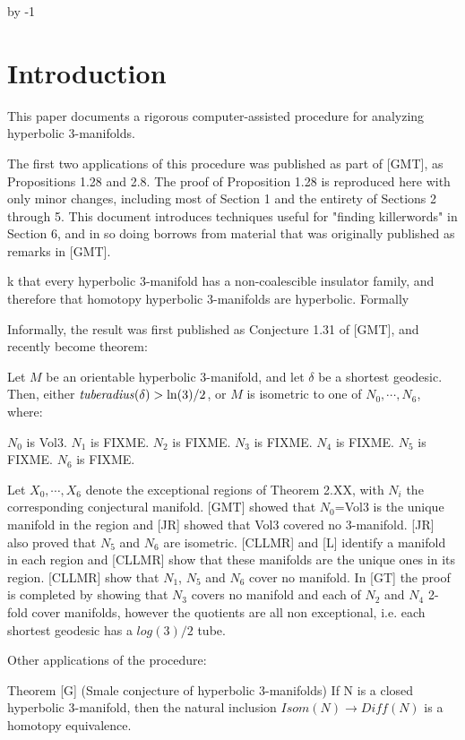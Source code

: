 \def\Arccosh{{\rm Arccosh}}
\advance\sectioncount by -1
\section{Introduction}

This paper documents a rigorous computer-assisted procedure for analyzing 
hyperbolic $3$-manifolds.

The first two applications of this procedure was published as part of [GMT],
as Propositions 1.28 and 2.8. The proof of Proposition 1.28 is reproduced here
with only minor changes, including most of Section 1 and the entirety of Sections 2 through 5.
This document introduces techniques useful for "finding killerwords" in Section 6,
and in so doing borrows from material that was originally published as remarks
in [GMT].

k
that every hyperbolic $3$-manifold has a non-coalescible insulator family,
and therefore that homotopy hyperbolic $3$-manifolds are hyperbolic. Formally

Informally, the result was first published as Conjecture 1.31 of [GMT],
and recently become theorem:

 Let $M$ be an orientable hyperbolic $3$-manifold, and let $\delta$ be
a shortest geodesic. Then, either ${\it tuberadius}(\delta) > \ln(3)/2$, or
$M$ is isometric to one of $N_0, \cdots, N_6$, where:
\begin{itemize}
 $N_0$ is Vol3.
 $N_1$ is FIXME.
 $N_2$ is FIXME.
 $N_3$ is FIXME.
 $N_4$ is FIXME.
 $N_5$ is FIXME.
 $N_6$ is FIXME.
\end{itemize}
\endproclaim
{}
Let $X_0, \cdots, X_6$ denote the exceptional regions of Theorem 2.XX,
with $N_i$ the corresponding conjectural manifold.
[GMT] showed that $N_0$=Vol3 is the unique manifold in the region
and [JR] showed that Vol3 covered no 3-manifold.
[JR] also proved that $N_5$ and $N_6$ are isometric.
[CLLMR] and [L] identify a manifold in each region
and [CLLMR] show that these manifolds are the unique ones in its region.
[CLLMR] show that $N_1$, $N_5$ and $N_6$ cover no manifold.
In [GT] the proof is completed by showing that $N_3$ covers no manifold
and each of $N_2$ and $N_4$ 2-fold cover manifolds,
however the quotients are all non exceptional,
i.e. each shortest geodesic has a $log(3)/2$ tube.
\enddemo

Other applications of the procedure:

Theorem [G]  (Smale conjecture of hyperbolic 3-manifolds)
If N is a closed hyperbolic 3-manifold,
then the natural inclusion $Isom(N)\to Diff(N)$ is a homotopy equivalence.

